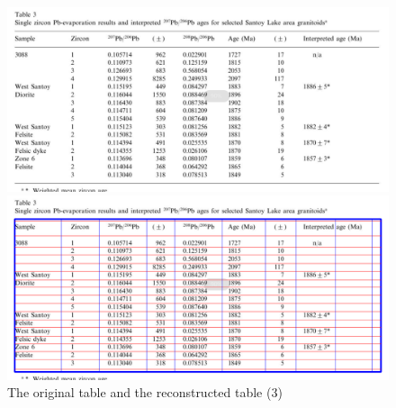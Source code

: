 \documentclass[12pt, a4paper]{article}
\theoremstyle{definition}
\begin{document}
\begin{figure}[htbp]
	\centering
		\begin{minipage}[t]{0.9\linewidth}
		\centering
		\includegraphics[width=\linewidth]{3.png}
		\end{minipage}
		\linebreak 
		\begin{minipage}[t]{0.9\linewidth}
		\centering
		\includegraphics[width=\linewidth]{reconstructed_3.png}
		\end{minipage}
	\caption{The original table and the reconstructed table (3)}
	\label{fig3}
\end{figure}
\end{document}
